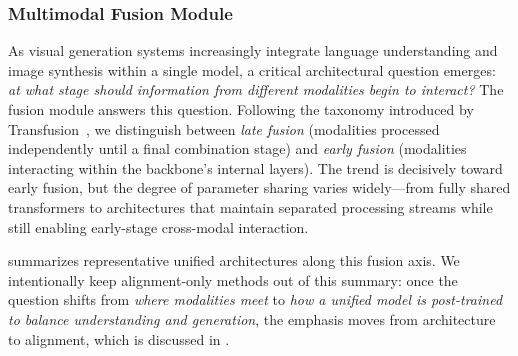 \documentclass{llmxive}
\begin{document}
\subsubsection{Multimodal Fusion Module}
\label{sec:arch_fusion}


As visual generation systems increasingly integrate language understanding and image synthesis within a single model, a critical architectural question emerges: \emph{at what stage should information from different modalities begin to interact?} The fusion module answers this question. Following the taxonomy introduced by Transfusion~\citep{zhou2024transfusion}, we distinguish between \emph{late fusion} (modalities processed independently until a final combination stage) and \emph{early fusion} (modalities interacting within the backbone's internal layers). The trend is decisively toward early fusion, but the degree of parameter sharing varies widely---from fully shared transformers to architectures that maintain separated processing streams while still enabling early-stage cross-modal interaction.

 summarizes representative unified architectures along this fusion axis. We intentionally keep alignment-only methods out of this summary: once the question shifts from \emph{where modalities meet} to \emph{how a unified model is post-trained to balance understanding and generation}, the emphasis moves from architecture to alignment, which is discussed in .
\end{document}
